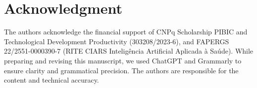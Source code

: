 \documentclass[conference]{IEEEtran}
\begin{document}
\section*{Acknowledgment}
The authors acknowledge the financial support of CNPq Scholarship PIBIC and Technological Development Productivity (303208/2023-6), and FAPERGS 22/2551-0000390-7 (RITE CIARS Inteligência Artificial Aplicada à Saúde).
While preparing and revising this manuscript, we used ChatGPT and Grammarly to ensure clarity and grammatical precision. The authors are responsible for the content and technical accuracy.





%
%

\end{document}
